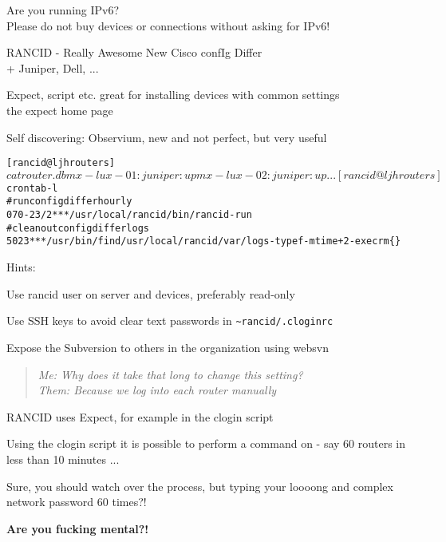 \documentclass[28pt,landscape,a4paper,footrule]{foils}
\begin{document}
Are you running IPv6?\\
Please do not buy devices or connections without asking for IPv6!

\begin{slidelist}
\item RANCID - Really Awesome New Cisco confIg Differ\\
+ Juniper, Dell, ... 
\item Expect, script etc. great for installing devices with common settings\\
 the expect home page
\item Self discovering: Observium, new and not perfect, but very useful
\end{slidelist}



\begin{alltt}\footnotesize
[rancid@ljh routers]$ cat router.db 
mx-lux-01:juniper:up
mx-lux-02:juniper:up
...
[rancid@ljh routers]$ crontab -l
# run config differ hourly
07 0-23/2 * * * /usr/local/rancid/bin/rancid-run
# clean out config differ logs
50 23 * * * /usr/bin/find /usr/local/rancid/var/logs -type f -mtime +2 -exec rm \{\} 
\end{alltt}



\begin{slidelist}
\item Hints:
\item Use rancid user on server and devices, preferably read-only
\item Use SSH keys to avoid clear text passwords in \verb+~rancid/.cloginrc+
\item Expose the Subversion to others in the organization using websvn
\end{slidelist}



\begin{quote}
\it Me: Why does it take that long to change this setting?\\
Them: Because we log into each router manually
\end{quote}

\vskip 1cm
\begin{slidelist}
\item RANCID uses Expect, for example in the clogin script
\item Using the clogin script it is possible to perform a command on - say
60 routers in less than 10 minutes ...
\item Sure, you should watch over the process, but typing your loooong and complex network password 60 times?!
\end{slidelist}
\centerline{\bf Are you fucking mental?!}
\end{document}
